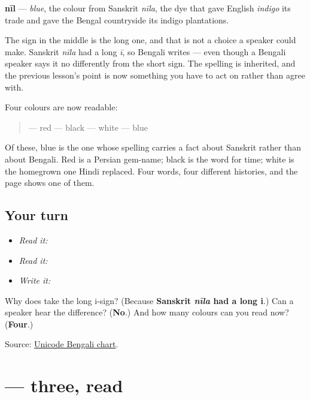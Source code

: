 \textbf{nīl} — \emph{blue}, the colour from Sanskrit \emph{nīla}, the dye that gave English \emph{indigo} its trade and gave the Bengal countryside its indigo plantations.

The sign in the middle is the long one, and that is not a choice a speaker could make. Sanskrit \emph{nīla} had a long \emph{ī}, so Bengali writes \textbf{} — even though a Bengali speaker says it no differently from the short sign. The spelling is inherited, and the previous lesson's point is now something you have to act on rather than agree with.

Four colours are now readable:

\begin{quote}
\textbf{} — red \textbf{} — black \textbf{} — white \textbf{} — blue
\end{quote}

Of these, blue is the one whose spelling carries a fact about Sanskrit rather than about Bengali. Red is a Persian gem-name; black is the word for time; white is the homegrown one Hindi replaced. Four words, four different histories, and the page shows one of them.

\subsection*{Your turn}
\begin{itemize}
\raggedright
  \item \emph{Read it:} 
  \item \emph{Read it:}    
  \item \emph{Write it:} 
\end{itemize}

\begin{tcolorbox}[breakable,colback=teal!4,colframe=teal!35!black,title={Before you move on}]
Why does \textbf{} take the long i-sign? (Because \textbf{Sanskrit \emph{nīla} had a long i}.) Can a speaker hear the difference? (\textbf{No}.) And how many colours can you read now? (\textbf{Four}.)

Source: \href{https://www.unicode.org/charts/PDF/U0980.pdf}{Unicode Bengali chart}.
\end{tcolorbox}
\section[tin]{ — three, read}

